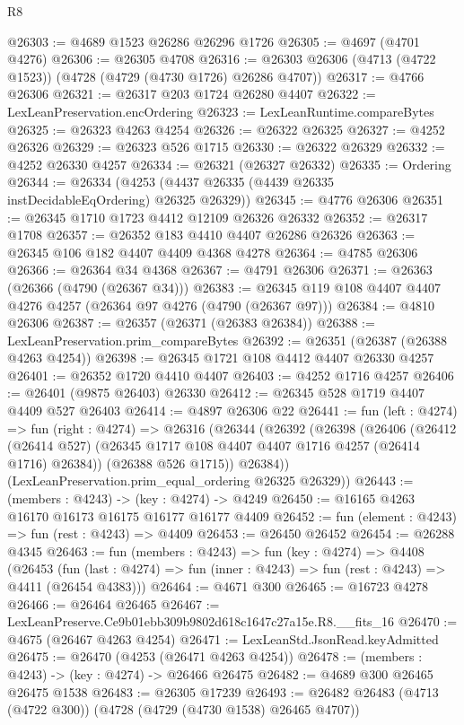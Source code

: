 \begin{lexlean}{R8}
\begin{coremodule}
@26303 := @4689 @1523 @26286 @26296 @1726
@26305 := @4697 (@4701 @4276)
@26306 := @26305 @4708
@26316 := @26303 @26306 (@4713 (@4722 @1523)) (@4728 (@4729 (@4730 @1726) @26286 @4707))
@26317 := @4766 @26306
@26321 := @26317 @203 @1724 @26280 @4407
@26322 := LexLeanPreservation.encOrdering
@26323 := LexLeanRuntime.compareBytes
@26325 := @26323 @4263 @4254
@26326 := @26322 @26325
@26327 := @4252 @26326
@26329 := @26323 @526 @1715
@26330 := @26322 @26329
@26332 := @4252 @26330 @4257
@26334 := @26321 (@26327 @26332)
@26335 := Ordering
@26344 := @26334 (@4253 (@4437 @26335 (@4439 @26335 instDecidableEqOrdering) @26325 @26329))
@26345 := @4776 @26306
@26351 := @26345 @1710 @1723 @4412 @12109 @26326 @26332
@26352 := @26317 @1708
@26357 := @26352 @183 @4410 @4407 @26286 @26326
@26363 := @26345 @106 @182 @4407 @4409 @4368 @4278
@26364 := @4785 @26306
@26366 := @26364 @34 @4368
@26367 := @4791 @26306
@26371 := @26363 (@26366 (@4790 (@26367 @34)))
@26383 := @26345 @119 @108 @4407 @4407 @4276 @4257 (@26364 @97 @4276 (@4790 (@26367 @97)))
@26384 := @4810 @26306
@26387 := @26357 (@26371 (@26383 @26384))
@26388 := LexLeanPreservation.prim_compareBytes
@26392 := @26351 (@26387 (@26388 @4263 @4254))
@26398 := @26345 @1721 @108 @4412 @4407 @26330 @4257
@26401 := @26352 @1720 @4410 @4407
@26403 := @4252 @1716 @4257
@26406 := @26401 (@9875 @26403) @26330
@26412 := @26345 @528 @1719 @4407 @4409 @527 @26403
@26414 := @4897 @26306 @22
@26441 := fun (left : @4274) =>
  fun (right : @4274) =>
  @26316
    (@26344
      (@26392
        (@26398
          (@26406
            (@26412 (@26414 @527) (@26345 @1717 @108 @4407 @4407 @1716 @4257 (@26414 @1716) @26384))
            (@26388 @526 @1715))
          @26384))
      (LexLeanPreservation.prim_equal_ordering @26325 @26329))
@26443 := (members : @4243) -> (key : @4274) -> @4249
@26450 := @16165 @4263 @16170 @16173 @16175 @16177 @16177 @4409
@26452 := fun (element : @4243) => fun (rest : @4243) => @4409
@26453 := @26450 @26452
@26454 := @26288 @4345
@26463 := fun (members : @4243) =>
  fun (key : @4274) =>
  @4408
    (@26453
      (fun (last : @4274) => fun (inner : @4243) => fun (rest : @4243) => @4411 (@26454 @4383)))
@26464 := @4671 @300
@26465 := @16723 @4278
@26466 := @26464 @26465
@26467 := LexLeanPreserve.Ce9b01ebb309b9802d618c1647c27a15e.R8.__fits_16
@26470 := @4675 (@26467 @4263 @4254)
@26471 := LexLeanStd.JsonRead.keyAdmitted
@26475 := @26470 (@4253 (@26471 @4263 @4254))
@26478 := (members : @4243) -> (key : @4274) -> @26466 @26475
@26482 := @4689 @300 @26465 @26475 @1538
@26483 := @26305 @17239
@26493 := @26482 @26483 (@4713 (@4722 @300)) (@4728 (@4729 (@4730 @1538) @26465 @4707))

\end{coremodule}
\end{lexlean}
